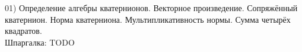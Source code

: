 01) Определение алгебры кватернионов. Векторное произведение. Сопряжённый кватернион. Норма кватерниона. Мультипликативность нормы. Сумма четырёх квадратов.\\

Шпаргалка: TODO\\
